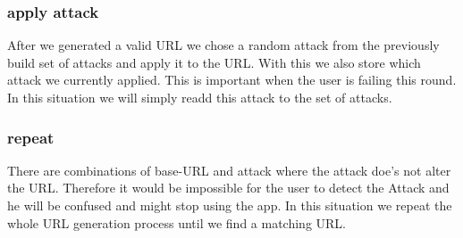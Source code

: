 \subsubsection{apply attack}
After we generated a valid URL we chose a random attack from the previously build set of attacks and apply it to the URL. With this we also store which attack we currently applied. This is important when the user is failing this round. In this situation we will simply readd this attack to the set of attacks.
\subsubsection{repeat}
There are combinations of base-URL and attack where the attack doe's not alter the URL.
Therefore it would be impossible for the user to detect the Attack and he will be confused and might stop using the app.
In this situation we repeat the whole URL generation process until we find a matching URL.